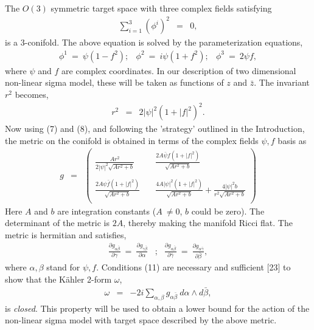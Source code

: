 \documentclass[a4paper,12pt]{article}
\begin{document}
{{The $O(3)$ symmetric target space with three complex fields satisfying  
\begin{eqnarray}
\sum_{i=1}^{3} ({\phi}^i)^2 &=& 0,
\end{eqnarray}
is a $3$-conifold. The above equation is solved by the parameterization
equations, 
\begin{eqnarray}
{\phi}^1\ =\ \psi(1-f^2); & {\phi}^2\ =\ i\psi(1+f^2);& {\phi}^3\ =\ 2\psi f,
\end{eqnarray}
where $\psi$ and $f$ are complex coordinates.  
In our description of two dimensional  
non-linear sigma model, these
will be taken as functions of $z$ and $\bar{z}$.  
The invariant $r^2$ becomes,
\begin{eqnarray}
r^2 &=& 2{|\psi|}^2(1+{|f|}^2)^2.
\end{eqnarray}
Now using (7) and 
(8), and following the 'strategy' outlined in the Introduction, the metric on the 
conifold is obtained in terms of the complex fields $\psi, f$ basis as
\begin{eqnarray}
g&=& \left( \begin{array}{lcr}  
\frac{Ar^2}{2{|\psi |}^2\sqrt{Ar^2+b}} &\ & \frac{2A\bar{\psi}f(1+{|f|}^2)}
{\sqrt{Ar^2+b}} \\
  &\ & \\
\frac{2A\psi \bar{f}(1+{|f|}^2)}{\sqrt{Ar^2+b}} &\ & \frac{4A{|\psi |}^2
(1+{|f|}^2)}{\sqrt{Ar^2+b}}+\frac{4{| \psi |}^2b}{r^2\sqrt{Ar^2+b}} \\
 \end{array} \right) 
\end{eqnarray}    
Here $A$ and $b$ are integration constants ($A\ \neq 0$, $b$ could be zero). The determinant
of the metric is $2A$, thereby making the manifold Ricci flat. The metric is hermitian and 
satisfies,
\begin{eqnarray}
\frac{\partial g_{\alpha \bar{\beta}}}{\partial \gamma}\ =\ \frac{\partial g_{\gamma
\bar{\beta}}}{\partial \alpha} &;& \frac{\partial g_{\alpha \bar{\beta}}}{\partial
\bar{\gamma}}\ =\ \frac{\partial g_{\alpha \bar{\gamma}}}{\partial \bar{\beta}},
\end{eqnarray}
where $\alpha, \beta$ stand for $\psi, f$. Conditions (11) are 
necessary and sufficient [23] to show that  
the K\"{a}hler 2-form
$\omega $,
\begin{eqnarray}
\omega &=& -2i\sum_{\alpha, \beta} g_{\alpha \bar{\beta}}\ d\alpha \wedge d\bar{\beta},
\end{eqnarray}
is {\it{closed}}. This property will be used to obtain a lower bound for the action of
the non-linear sigma model with target space described by the above metric. 

}}
\end{document}
